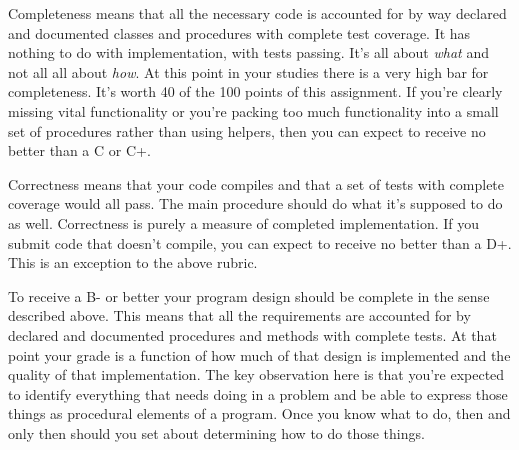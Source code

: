 \documentclass[10pt]{article}
\begin{document}
Completeness means that all the necessary code is accounted for by way declared and documented classes and procedures with complete test coverage. It has nothing to do with implementation, with tests passing. It's all about \textit{what} and not all all about \textit{how}. At this point in your studies there is a very high bar for completeness.  It's worth 40 of the 100 points of this assignment. If you're clearly missing vital functionality or you're packing too much functionality into a small set of procedures rather than using helpers, then you can expect to receive no better than a C or C+. 

Correctness means that your code compiles and that a set of tests with complete coverage would all pass. The main procedure should do what it's supposed to do as well.  Correctness is purely a measure of completed implementation.  If you submit code that doesn't compile, you can expect to receive no better than a D+.  This is an exception to the above rubric. 

To receive a B- or better your program design should be complete in the sense described above. This means that all the requirements are accounted for by declared and documented procedures and methods with complete tests. At that point your grade is a function of how much of that design is implemented and the quality of that implementation. The key observation here is that you're expected to identify everything that needs doing in a problem and be able to express those things as procedural elements of a program.  Once you know what to do, then and only then should you set about determining how to do those things.    
\end{document}
